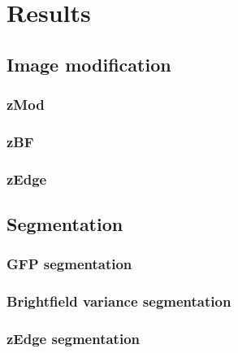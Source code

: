 
\chapter{Results}

\ifpdf
    \graphicspath{{Chapter5/Figs/Raster/}{Chapter5/Figs/PDF/}{Chapter5/Figs/}}
\else
    \graphicspath{{Chapter5/Figs/Vector/}{Chapter5/Figs/}}
\fi

\section{Image modification}

\subsection{zMod}

\subsection{zBF}

\subsection{zEdge}

\section{Segmentation}

\subsection{GFP segmentation}

\subsection{Brightfield variance segmentation}

\subsection{zEdge segmentation}

